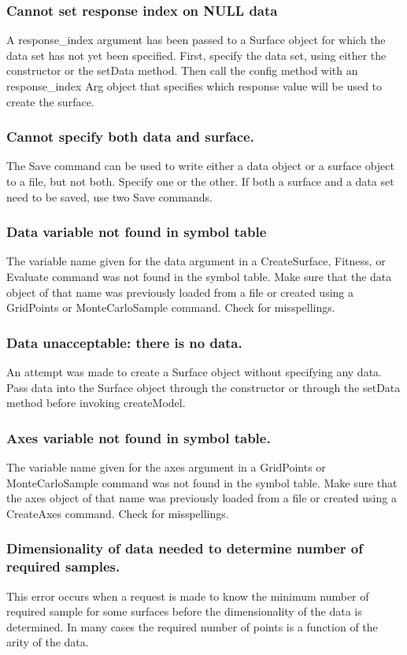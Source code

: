 \documentclass{article}
\begin{document}
\subsubsection{Cannot set response index on NULL data }
A response\_index argument has been passed to a Surface object for which the data set has not yet been specified.  First, specify the data set, using either the constructor or the setData method.  Then call the config method with an response\_index Arg object that specifies which response value will be used to create the surface.

\subsubsection{Cannot specify both data and surface.}
The Save command can be used to write either a data object or a surface object to a file, but not both.  Specify one or the other.  If both a surface and a data set need to be saved, use two Save commands.

\subsubsection{Data variable not found in symbol table}
The variable name given for the data argument in a CreateSurface, Fitness, or Evaluate command was not found in the symbol table.  Make sure that the data object of that name was previously loaded from a file or created using a GridPoints or MonteCarloSample command.  Check for misspellings.

\subsubsection{Data unacceptable: there is no data.}
An attempt was made to create a Surface object without specifying any data.  Pass data into the Surface object through the constructor or through the setData method before invoking createModel.

\subsubsection{Axes variable not found in symbol table.}
The variable name given for the axes argument in a GridPoints or MonteCarloSample command was not found in the symbol table.  Make sure that the axes object of that name was previously loaded from a file or created using a CreateAxes command.  Check for misspellings.

\subsubsection{Dimensionality of data needed to determine number of required samples.}
This error occurs when a request is made to know the minimum number of required sample for some surfaces before the dimensionality of the data is determined.  In many cases the required number of points is a function of the arity of the data.
\end{document}
